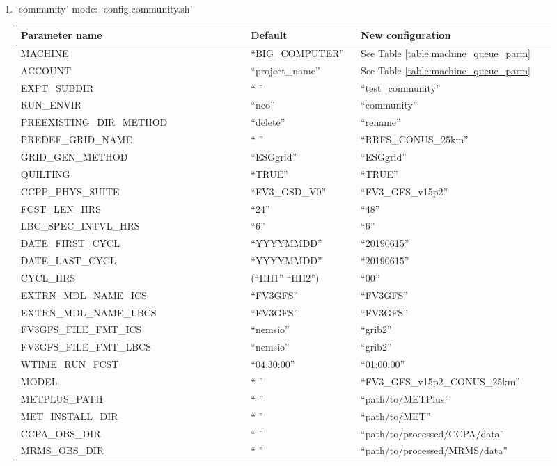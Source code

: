 \documentclass[11pt,fleqn]{report}              %
\begin{document}
\begin{enumerate}
\item `community' mode: `config.community.sh'

{
\fontsize{9}{11}\selectfont
\begin{longtable}{p{0.4\linewidth} | p{0.18\linewidth} | p{0.34\linewidth} }
\hline
\hline
 Parameter name & Default  & New configuration \\
\hline
MACHINE & ``BIG\_COMPUTER'' & See Table \ref{table:machine_queue_parm} \\
 ACCOUNT & ``project\_name'' & See Table \ref{table:machine_queue_parm} \\
 EXPT\_SUBDIR & `` '' & ``test\_community''  \\
 RUN\_ENVIR & ``nco'' & ``community''  \\
 PREEXISTING\_DIR\_METHOD & ``delete''  & ``rename'' \\
 PREDEF\_GRID\_NAME & `` '' & ``RRFS\_CONUS\_25km'' \\
 GRID\_GEN\_METHOD & ``ESGgrid'' & ``ESGgrid'' \\
 QUILTING & ``TRUE'' & ``TRUE'' \\
 CCPP\_PHYS\_SUITE & ``FV3\_GSD\_V0'' & ``FV3\_GFS\_v15p2'' \\
 FCST\_LEN\_HRS & ``24'' & ``48'' \\
 LBC\_SPEC\_INTVL\_HRS & ``6'' & ``6'' \\
 DATE\_FIRST\_CYCL & ``YYYYMMDD'' & ``20190615'' \\
 DATE\_LAST\_CYCL & ``YYYYMMDD'' & ``20190615'' \\
 CYCL\_HRS & (``HH1'' ``HH2'') & ``00'' \\
 EXTRN\_MDL\_NAME\_ICS & ``FV3GFS'' & ``FV3GFS'' \\
 EXTRN\_MDL\_NAME\_LBCS & ``FV3GFS'' & ``FV3GFS'' \\
 FV3GFS\_FILE\_FMT\_ICS & ``nemsio'' & ``grib2'' \\
 FV3GFS\_FILE\_FMT\_LBCS & ``nemsio'' & ``grib2'' \\
 WTIME\_RUN\_FCST & ``04:30:00'' & ``01:00:00'' \\
 MODEL & `` '' & ``FV3\_GFS\_v15p2\_CONUS\_25km'' \\
 METPLUS\_PATH & `` '' & ``path/to/METPlus'' \\
 MET\_INSTALL\_DIR & `` ''  & ``path/to/MET'' \\
 CCPA\_OBS\_DIR & `` '' & ``path/to/processed/CCPA/data'' \\
 MRMS\_OBS\_DIR & `` '' & ``path/to/processed/MRMS/data'' \\

\end{longtable}}
\end{enumerate}
\end{document}
